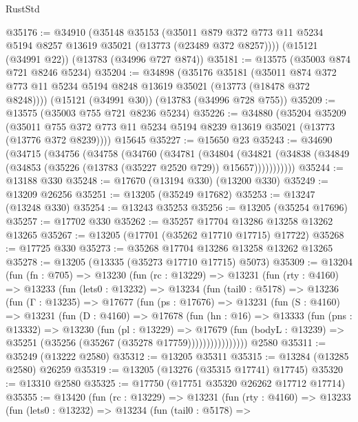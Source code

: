 \begin{lexlean}{RustStd}
\begin{coremodule}
@35176 := @34910
    (@35148
      @35153
      (@35011 @879 @372 @773 @11 @5234 @5194 @8257 @13619 @35021 (@13773 (@23489 @372 @8257))))
    (@15121 (@34991 @22))
    (@13783 (@34996 @727 @874))
@35181 := @13575 (@35003 @874 @721 @8246 @5234)
@35204 := @34898
    (@35176
      @35181
      (@35011 @874 @372 @773 @11 @5234 @5194 @8248 @13619 @35021 (@13773 (@18478 @372 @8248))))
    (@15121 (@34991 @30))
    (@13783 (@34996 @728 @755))
@35209 := @13575 (@35003 @755 @721 @8236 @5234)
@35226 := @34880
    (@35204
      @35209
      (@35011 @755 @372 @773 @11 @5234 @5194 @8239 @13619 @35021 (@13773 (@13776 @372 @8239))))
    @15645
@35227 := @15650 @23
@35243 := @34690
    (@34715
      (@34756
        (@34758
          (@34760
            (@34781
              (@34804
                (@34821
                  (@34838 (@34849 (@34853 (@35226 (@13783 (@35227 @2520 @729)) @15657)))))))))))
@35244 := @13188 @330
@35248 := @17670 (@13194 @330) (@13200 @330)
@35249 := @13209 @26256
@35251 := @13205 (@35249 @17682)
@35253 := @13247 (@13248 @330)
@35254 := @13243 @35253
@35256 := @13205 (@35254 @17696)
@35257 := @17702 @330
@35262 := @35257 @17704 @13286 @13258 @13262 @13265
@35267 := @13205 (@17701 (@35262 @17710 @17715) @17722)
@35268 := @17725 @330
@35273 := @35268 @17704 @13286 @13258 @13262 @13265
@35278 := @13205 (@13335 (@35273 @17710 @17715) @5073)
@35309 := @13204
    (fun (fn : @705) =>
    @13230
      (fun (rc : @13229) =>
      @13231
        (fun (rty : @4160) =>
        @13233
          (fun (lets0 : @13232) =>
          @13234
            (fun (tail0 : @5178) =>
            @13236
              (fun (Γ : @13235) =>
              @17677
                (fun (ps : @17676) =>
                @13231
                  (fun (S : @4160) =>
                  @13231
                    (fun (D : @4160) =>
                    @17678
                      (fun (hn : @16) =>
                      @13333
                        (fun (pns : @13332) =>
                        @13230
                          (fun (pl : @13229) =>
                          @17679
                            (fun (bodyL : @13239) =>
                            @35251 (@35256 (@35267 (@35278 @17759))))))))))))))))
    @2580
@35311 := @35249 (@13222 @2580)
@35312 := @13205 @35311
@35315 := @13284 (@13285 @2580) @26259
@35319 := @13205 (@13276 (@35315 @17741) @17745)
@35320 := @13310 @2580
@35325 := @17750 (@17751 @35320 @26262 @17712 @17714)
@35355 := @13420
    (fun (rc : @13229) =>
    @13231
      (fun (rty : @4160) =>
      @13233
        (fun (lets0 : @13232) =>
        @13234
          (fun (tail0 : @5178) =>

\end{coremodule}
\end{lexlean}
